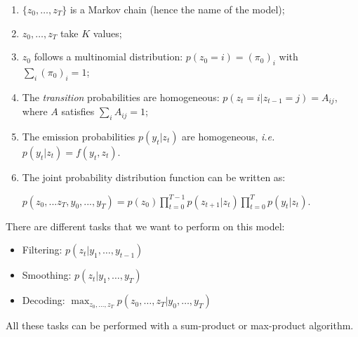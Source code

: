 \documentclass[12pt,a4paper]{report}
\begin{document}
\begin{enumerate}
	\item $\{z_0,\dots,z_T\}$ is a Markov chain (hence the name of the model);
	\item $z_0,\ldots,z_T$ take $K$ values;
	\item $z_0$ follows a multinomial distribution: $p(z_0 = i) = (\pi_0)_i$ with $\displaystyle \sum_{i} (\pi_0)_i=1$;
	\item The \textit{transition} probabilities are homogeneous: $p(z_t = i | z_{t-1} =j) = A_{ij}$, where $A$ satisfies $\displaystyle \sum_{i}A_{ij}=1$;
	\item The emission probabilities $p(y_t | z_t)$ are homogeneous, \textit{i.e.} $p(y_t | z_t) = f(y_t,z_t)$.
	\item The joint probability distribution function can be written as:
	\begin{center}
$p(z_0,...z_T,y_0,...,y_T) = p(z_0) \displaystyle \prod_{t=0}^{T-1} p(z_{t+1}|z_t) \displaystyle \prod_{t=0}^T p(y_t|z_t)$.
	\end{center}

\end{enumerate}

There are different tasks that we want to perform on this model:

\begin{itemize}
\item Filtering: $p(z_t | y_1,\ldots,y_{t-1})$
\item Smoothing: $p(z_t | y_1,\ldots,y_{T})$
\item Decoding: $\displaystyle \max_{z_0,\ldots,z_T} p(z_0,\ldots,z_T | y_0,\ldots,y_T)$
\end{itemize}

All these tasks can be performed with a sum-product or max-product algorithm.
\end{document}
